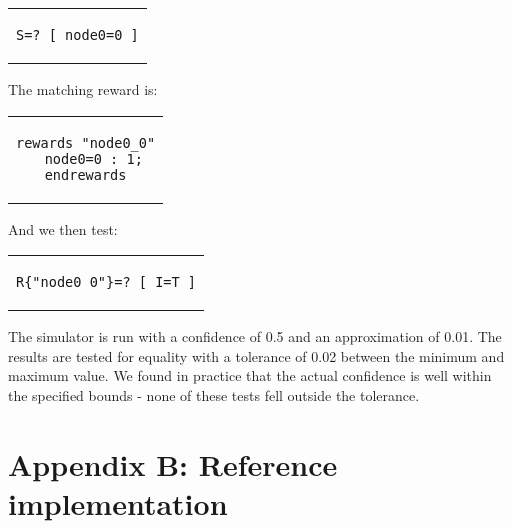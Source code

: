 \documentclass[a4paper,10pt]{article}
\newenvironment{prismprop}[0]{
  \begin{center}
  \begin{tabular}{c}
  \footnotesize
}{
  \end{tabular}
  \end{center}
}
\begin{document}
\begin{prismprop}
\begin{lstlisting}
S=? [ node0=0 ]
\end{lstlisting}
\end{prismprop}

\noindent The matching reward is:

\begin{prismprop}
\begin{lstlisting}
rewards "node0_0"
  node0=0 : 1;
endrewards
\end{lstlisting}
\end{prismprop}

\noindent And we then test:

\begin{prismprop}
\begin{lstlisting}
R{"node0_0"}=? [ I=T ]
\end{lstlisting}
\end{prismprop}

The simulator is run with a confidence of 0.5 and an approximation of 0.01. The results are tested for equality with a tolerance of 0.02 between the minimum and maximum value. We found in practice that the actual confidence is well within the specified bounds - none of these tests fell outside the tolerance.

\section{Appendix B: Reference implementation}



\end{document}
